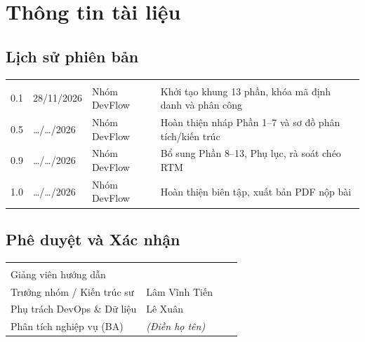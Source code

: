 \clearpage
\section*{Thông tin tài liệu}

\subsection*{Lịch sử phiên bản}
\begin{tabularx}{\textwidth}{L{1.8cm} L{2.4cm} L{3.6cm} Y}
   &  &  &  \\
  0.1 & 28/11/2026 & Nhóm DevFlow & Khởi tạo khung 13 phần, khóa mã định danh và phân công \\
  0.5 & \ldots/\ldots/2026 & Nhóm DevFlow & Hoàn thiện nháp Phần 1--7 và sơ đồ phân tích/kiến trúc \\
  0.9 & \ldots/\ldots/2026 & Nhóm DevFlow & Bổ sung Phần 8--13, Phụ lục, rà soát chéo RTM \\
  1.0 & \ldots/\ldots/2026 & Nhóm DevFlow & Hoàn thiện biên tập, xuất bản PDF nộp bài \\
  \bottomrule
\end{tabularx}

\vspace{16pt}
\subsection*{Phê duyệt và Xác nhận}
\begin{tabularx}{\textwidth}{L{4.2cm} L{4.2cm} L{3.2cm} Y}
   &  &  &  \\
  Giảng viên hướng dẫn & & & \\
  Trưởng nhóm / Kiến trúc sư & Lâm Vĩnh Tiến & & \\
  Phụ trách DevOps \& Dữ liệu & Lê Xuân & & \\
  Phân tích nghiệp vụ (BA) & \emph{(Điền họ tên)} & & \\
  \bottomrule
\end{tabularx}
